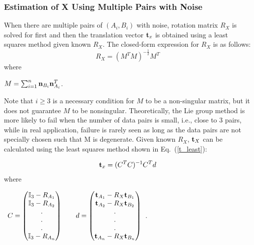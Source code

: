 \documentclass[twocolumn,10pt]{asme2ej}
\newcommand{\nn}{{\bf n}}
\newcommand{\ttt}{{\bf t}}
\begin{document}
\subsubsection{Estimation of X Using Multiple Pairs with Noise}
When there are multiple pairs of $(A_{i}, B_{i})$ with noise, rotation matrix $R_{X}$ is solved for first and then the translation vector $\ttt_{x}$ is obtained using a least squares method given known $R_{X}$. The closed-form expression for $R_{X}$ is as follows:
\begin{equation}
R_{X} = (M^{T}M)^{-\frac{1}{2}}M^{T}
\end{equation}
where \\
\begin{center}
$M = \sum_{i=1}^{n}{\nn_{B_{i}} \nn_{A_{i}}^{T}}$.
\end{center}
Note that $i \geq 3$ is a necessary condition for $M$ to be a non-singular matrix, but it does not guarantee $M$ to be nonsingular. Theoretically, the Lie group method is more likely to fail when the number of data pairs is small, i.e., close to 3 pairs, while in real application, failure is rarely seen as long as the data pairs are not specially chosen such that M is degenerate. Given known $R_{X}$, $\ttt_{X}$ can be calculated using the least squares method shown in Eq.~(\ref{t_least}):

\begin{equation}
\ttt_{x} = (C^{T}C)^{-1}C^{T}d
\label{t_least}
\end{equation}
where\\

\begin{center}
$\begin{array}{lr}
C = \begin{pmatrix}
\mathbb{I}_{3} - R_{{A_{1}}}\\
\mathbb{I}_{3} - R_{{A_{2}}}\\
.\\
.\\
.\\
\mathbb{I}_{3} - R_{{A_{n}}}\\
\end{pmatrix}
\; \; 
& \; \;
d = \begin{pmatrix}
\ttt_{A_{1}} - R_{X}\ttt_{B_{1}}\\
\ttt_{A_{2}} - R_{X}\ttt_{B_{2}}\\.\\
.\\
.\\
\ttt_{A_{n}} - R_{X}\ttt_{B_{n}}\\\end{pmatrix} 
\end{array}$.
\end{center}
\end{document}
